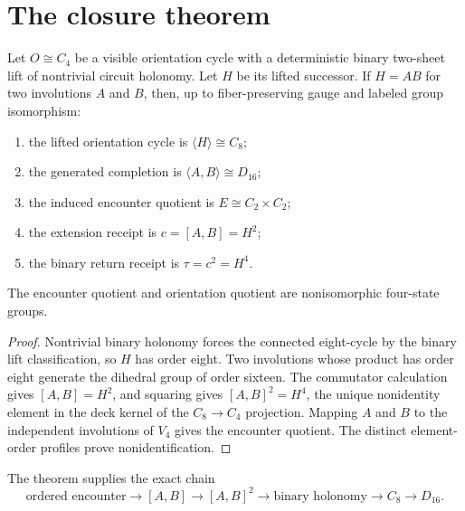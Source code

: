 \section{The closure theorem}

\begin{theorem}
Let \(O\cong C_4\) be a visible orientation cycle with a deterministic
binary two-sheet lift of nontrivial circuit holonomy. Let \(H\) be its
lifted successor. If \(H=AB\) for two involutions \(A\) and \(B\),
then, up to fiber-preserving gauge and labeled group isomorphism:
\begin{enumerate}
\item the lifted orientation cycle is \(\langle H\rangle\cong C_8\);
\item the generated completion is \(\langle A,B\rangle\cong D_{16}\);
\item the induced encounter quotient is \(E\cong C_2\times C_2\);
\item the extension receipt is \(c=[A,B]=H^2\);
\item the binary return receipt is \(\tau=c^2=H^4\).
\end{enumerate}
The encounter quotient and orientation quotient are nonisomorphic
four-state groups.
\end{theorem}

\begin{proof}
Nontrivial binary holonomy forces the connected eight-cycle by the
binary lift classification, so \(H\) has order eight. Two involutions
whose product has order eight generate the dihedral group of order
sixteen. The commutator calculation gives \([A,B]=H^2\), and squaring
gives \([A,B]^2=H^4\), the unique nonidentity element in the deck
kernel of the \(C_8\to C_4\) projection. Mapping \(A\) and \(B\) to
the independent involutions of \(V_4\) gives the encounter quotient.
The distinct element-order profiles prove nonidentification.
\end{proof}

The theorem supplies the exact chain
\[
\text{ordered encounter}
\longrightarrow [A,B]
\longrightarrow [A,B]^2
\longrightarrow \text{binary holonomy}
\longrightarrow C_8
\longrightarrow D_{16}.
\]
